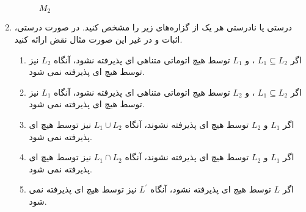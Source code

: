 \documentclass{article}
\begin{document}
\begin{enumerate}
		 \begin{figure}[h]
		 	\begin{minipage}{0.5\textwidth}
		 	\centering
			\caption{$M_1$}
			\label{M1}
		 	\end{minipage}%
		 	\begin{minipage}{0.5\textwidth}
		 		\centering
			 \caption{$M_2$}
			\label{M2}	 		
		 	\end{minipage}
	 	\end{figure}
	 
	 
		 	\item 
		 	درستی یا نادرستی هر یک از گزاره‌های زیر را مشخص کنید. در صورت درستی، اثبات و در غیر این صورت مثال نقض ارائه کنید.
		 \begin{enumerate}
		 			\item 
		 			اگر  $ L_1 \subseteq L_2 $	، و $L_1 $  توسط  هیچ اتوماتی متناهی ای پذیرفته نشود، آنگاه $L_2 $  نیز توسط هیچ  ای پذیرفته نمی شود.
		 			\item 
		 			اگر  $ L_1 \subseteq L_2 $	، و $L_2 $  توسط  هیچ اتوماتی متناهی ای پذیرفته نشود، آنگاه $L_1 $  نیز توسط هیچ  ای پذیرفته نمی شود.
		 			\item 
		 			اگر $L_1 $ و $L_2 $ توسط هیچ  ای پذیرفته نشوند، آنگاه $ L_1 \cup L_2 $ نیز توسط هیچ  ای پذیرفته نمی شود.
		 			\item 
		 			اگر $L_1 $ و $L_2 $ توسط هیچ  ای پذیرفته نشوند، آنگاه $ L_1 \cap L_2 $ نیز توسط هیچ  ای پذیرفته نمی شود.
		 			\item 
		 			اگر $L $ توسط هیچ  ای پذیرفته نشود، آنگاه $ L ^ \prime $ نیز توسط هیچ  ای پذیرفته نمی شود.
		 			
		 			
		 		
		 		\end{enumerate}
	
	\end{enumerate}
	
	
\end{document}
